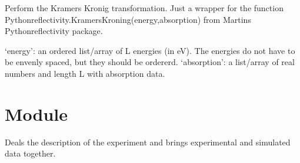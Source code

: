 \documentclass[letterpaper,10pt,english]{sphinxmanual}
\begin{document}
\begin{fulllineitems}
\label{\detokenize{modules-api/samplerepresentation:SampleRepresentation.KramersKronig}}
Perform the Kramers Kronig transformation. Just a wrapper for the function Pythonreflectivity.KramersKroning(energy,absorption) from Martins Pythonreflectivity package.

‘energy’: an ordered list/array of L energies (in eV). The energies do not have to be envenly spaced, but they should be ordererd.
‘absorption’: a list/array of real numbers and length L with absorption data.

\end{fulllineitems}



\section{Module }
\label{\detokenize{modules-api/experiment:module-Experiment}}\label{\detokenize{modules-api/experiment:module-experiment}}\label{\detokenize{modules-api/experiment::doc}}
Deals the description of the experiment and brings experimental and simulated data together.
\end{document}
